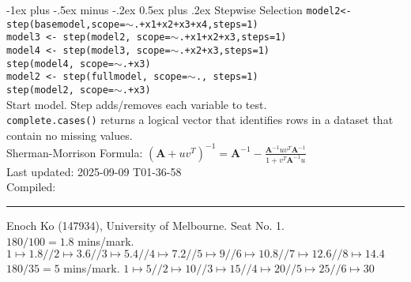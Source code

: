 \documentclass[10pt,landscape]{article}
\makeatletter
\renewcommand{\subsubsection}{\@startsection{subsubsection}{3}{0mm}%
                                {-1ex plus -.5ex minus -.2ex}%
                                {0.5ex plus .2ex}%
                                {\normalfont\small\bfseries}}
\makeatother
\begin{document}
\begin{multicols}{3}
\subsubsection{Stepwise Selection}
\texttt{model2<-step(basemodel,scope=$\sim$.+x1+x2+x3+x4,steps=1)\\
model3 <- step(model2, scope=$\sim$.+x1+x2+x3,steps=1)\\
model4 <- step(model3, scope=$\sim$.+x2+x3,steps=1)\\
step(model4, scope=$\sim$.+x3)\\
model2 <- step(fullmodel, scope=$\sim$., steps=1)\\
step(model2, scope=$\sim$.+x3)}\\
Start model. Step adds/removes each variable to test.\\
\medskip
\texttt{complete.cases()} returns a logical vector that identifies rows in a dataset that contain no missing values.\\
\medskip
Sherman-Morrison Formula:
$(\mathbf A+uv^T)^{-1}=\mathbf A^{-1}-\frac{\mathbf A^{-1}uv^T\mathbf A^{-1}}{1+v^T\mathbf A^{-1}u}$\\
\medskip
\vfill
Last updated:
2025-09-09 T01-36-58\\
Compiled: \DTMnow\\
\hrule
Enoch Ko (147934), University of Melbourne. Seat No. 1.\\
$180/100 = 1.8$ mins/mark. $1 \mapsto 1.8 // 2 \mapsto 3.6 //3 \mapsto 5.4 // 4 \mapsto 7.2 // 5 \mapsto 9 // 6 \mapsto 10.8 // 7 \mapsto 12.6// 8\mapsto 14.4$\\
$180/35 = 5$ mins/mark. $1 \mapsto 5 // 2 \mapsto 10 //3 \mapsto 15 // 4 \mapsto 20 // 5 \mapsto 25 // 6 \mapsto 30$\\
\end{multicols}
\end{document}
